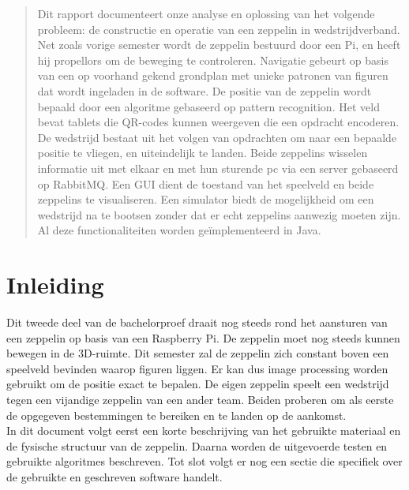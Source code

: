 \documentclass[eind]{penoverslag}
\begin{document}
\maketitlepage


\begin{abstract}
Dit rapport documenteert onze analyse en oplossing van het volgende probleem: de constructie en operatie van een zeppelin in wedstrijdverband. Net zoals vorige semester wordt de zeppelin bestuurd door een Pi, en heeft hij propellors om de beweging te controleren. Navigatie gebeurt op basis van een op voorhand gekend grondplan met unieke patronen van figuren dat wordt ingeladen in de software. De positie van de zeppelin wordt bepaald door een algoritme gebaseerd op pattern recognition. Het veld bevat tablets die QR-codes kunnen weergeven die een opdracht encoderen. De wedstrijd bestaat uit het volgen van opdrachten om naar een bepaalde positie te vliegen, en uiteindelijk te landen. Beide zeppelins wisselen informatie uit met elkaar en met hun sturende pc via een server gebaseerd op RabbitMQ. Een GUI dient de toestand van het speelveld en beide zeppelins te visualiseren. Een simulator biedt de mogelijkheid om een wedstrijd na te bootsen zonder dat er echt zeppelins aanwezig moeten zijn. Al deze functionaliteiten worden ge\"{i}mplementeerd in Java.\\
\end{abstract}


\tableofcontents\newpage


\section{Inleiding}
Dit tweede deel van de bachelorproef draait nog steeds rond het aansturen van een zeppelin op basis van een Raspberry Pi. De zeppelin moet nog steeds kunnen bewegen in de 3D-ruimte. Dit semester zal de zeppelin zich constant boven een speelveld bevinden waarop figuren liggen. Er kan dus image processing worden gebruikt om de positie exact te bepalen. De eigen zeppelin speelt een wedstrijd tegen een vijandige zeppelin van een ander team. Beiden proberen om als eerste de opgegeven bestemmingen te bereiken en te landen op de aankomst.\\
In dit document volgt eerst een korte beschrijving van het gebruikte materiaal en de fysische structuur van de zeppelin. Daarna worden de uitgevoerde testen en gebruikte algoritmes beschreven. Tot slot volgt er nog een sectie die specifiek over de gebruikte en geschreven software handelt. 
\end{document}
